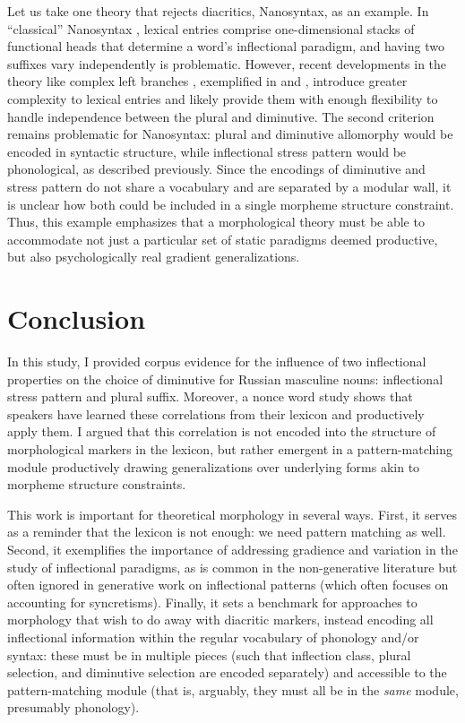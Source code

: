 \documentclass[output=paper,colorlinks,citecolor=brown
]{langscibook}
\begin{document}
Let us take one theory that rejects diacritics, Nanosyntax, as an example. In ``classical'' Nanosyntax \citep[e.g.][]{Caha2021}, lexical entries comprise one-dimensional stacks of functional heads that determine a word's inflectional paradigm, and having two suffixes vary independently is problematic. However, recent developments in the theory like complex left branches \citep{Blix2021}, exemplified in \citet{Janku2022} and \citet{Cortiula2023}, introduce greater complexity to lexical entries and likely provide them with enough flexibility to handle independence between the plural and diminutive. The second criterion remains problematic for Nanosyntax: plural and diminutive allomorphy would be encoded in syntactic structure, while inflectional stress pattern would be phonological, as described previously. Since the encodings of diminutive and stress pattern do not share a vocabulary and are separated by a modular wall, it is unclear how both could be included in a single morpheme structure constraint. Thus, this example emphasizes that a morphological theory must be able to accommodate not just a particular set of static paradigms deemed productive, but also psychologically real gradient generalizations.

\section{Conclusion}\label{sec:conc}
In this study, I provided corpus evidence for the influence of two inflectional properties on the choice of diminutive for Russian masculine nouns: inflectional stress pattern and plural suffix. Moreover, a nonce word study shows that speakers have learned these correlations from their lexicon and productively apply them. I argued that this correlation is not encoded into the structure of morphological markers in the lexicon, but rather emergent in a pattern-matching module productively drawing generalizations over underlying forms akin to morpheme structure constraints.

This work is important for theoretical morphology in several ways. First, it serves as a reminder that the lexicon is not enough: we need pattern matching as well. %
Second, it exemplifies the importance of addressing gradience and variation in the study of inflectional paradigms, as is common in the non-generative literature \citep[e.g.][]{Ackerman.Malouf2013} but often ignored in generative work on inflectional patterns (which often focuses on accounting for syncretisms). Finally, it sets a benchmark for approaches to morphology that wish to do away with diacritic markers, instead encoding all inflectional information within the regular vocabulary of phonology and/or syntax: these must be in multiple pieces (such that inflection class, plural selection, and diminutive selection are encoded separately) and accessible to the pattern-matching module (that is, arguably, they must all be in the \emph{same} module, presumably phonology). %
\end{document}
